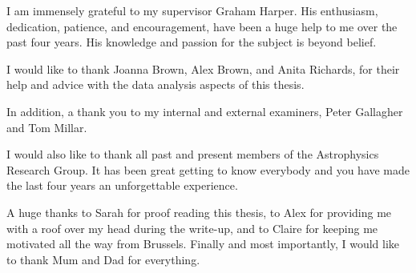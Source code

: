 




\begin{acknowledgements}      

I am immensely grateful to my supervisor Graham Harper. His enthusiasm, dedication, patience, and encouragement, have been a huge help to me over the past four years. His knowledge and passion for the subject is beyond belief.

I would like to thank Joanna Brown, Alex Brown, and Anita Richards, for their help and advice with the data analysis aspects of this thesis.

In addition, a thank you to my internal and external examiners, Peter Gallagher and Tom Millar.

I would also like to thank all past and present members of the Astrophysics Research Group. It has been great getting to know everybody and you have made the last four years an unforgettable experience.

A huge thanks to Sarah for proof reading this thesis, to Alex for providing me with a roof over my head during the write-up, and to Claire for keeping me motivated all the way from Brussels. Finally and most importantly, I would like to thank Mum and Dad for everything.

\end{acknowledgements}




